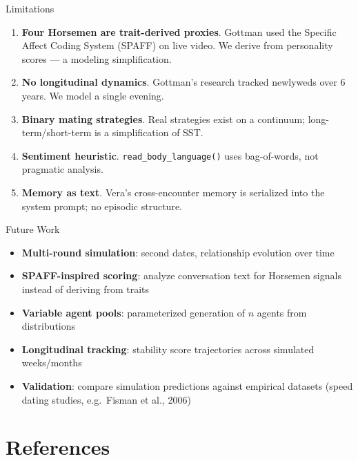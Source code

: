\documentclass[aspectratio=169, 11pt]{beamer}
\begin{document}
\begin{frame}{Limitations}
\begin{enumerate}
    \item \textbf{Four Horsemen are trait-derived proxies}. Gottman used the Specific Affect Coding System (SPAFF) on live video. We derive from personality scores --- a modeling simplification.
    
    \item \textbf{No longitudinal dynamics}. Gottman's research tracked newlyweds over 6 years. We model a single evening.
    
    \item \textbf{Binary mating strategies}. Real strategies exist on a continuum; long-term/short-term is a simplification of SST.
    
    \item \textbf{Sentiment heuristic}. \texttt{read\_body\_language()} uses bag-of-words, not pragmatic analysis.
    
    \item \textbf{Memory as text}. Vera's cross-encounter memory is serialized into the system prompt; no episodic structure.
\end{enumerate}
\end{frame}

\begin{frame}{Future Work}
\begin{itemize}
    \item \textbf{Multi-round simulation}: second dates, relationship evolution over time
    \item \textbf{SPAFF-inspired scoring}: analyze conversation text for Horsemen signals instead of deriving from traits
    \item \textbf{Variable agent pools}: parameterized generation of $n$ agents from distributions
    \item \textbf{Longitudinal tracking}: stability score trajectories across simulated weeks/months
    \item \textbf{Validation}: compare simulation predictions against empirical datasets (speed dating studies, e.g.\ Fisman et al., 2006)
\end{itemize}
\end{frame}

\section{References}
\end{document}
